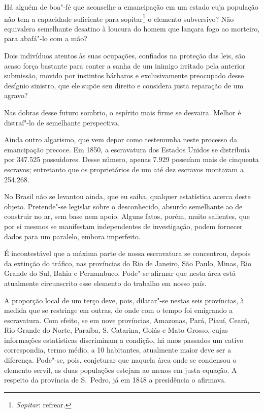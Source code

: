 Há alguém de boa"-fé que aconselhe a emancipação em um estado cuja
população não tem a capacidade suficiente para
sopitar\footnote{ \textit{Sopitar}: refrear.}
 o elemento subversivo? Não equivalera semelhante desatino à loucura do
homem que lançara fogo ao morteiro, para abafá"-lo com a mão?

Dois indivíduos atentos às suas ocupações, confiados na proteção das
leis, são acaso força bastante para conter a sanha de um inimigo
irritado pela anterior submissão, movido por instintos bárbaros e
exclusivamente preocupado desse desígnio sinistro, que ele supõe seu
direito e considera justa reparação de um agravo? 

Nas dobras desse futuro sombrio, o espírito mais firme se desvaira.
Melhor é distraí"-lo de semelhante perspectiva.  

Ainda outro algarismo, que vem depor como testemunha neste processo da
emancipação precoce. Em 1850, a escravatura dos Estados Unidos se
distribuía por 347.525 possuidores. Desse número, apenas 7.929 possuíam
mais de cinquenta escravos; entretanto que os proprietários de um até
dez escravos montavam a 254.268.

No Brasil não se levantou ainda, que eu saiba, qualquer estatística
acerca deste objeto. Pretende"-se legislar sobre o desconhecido,
absurdo semelhante ao de construir no ar, sem base nem apoio. Alguns
fatos, porém, muito salientes, que por si mesmos se manifestam
independentes de investigação, podem fornecer dados para um paralelo,
embora imperfeito.

É incontestável que a máxima parte de nossa escravatura se concentrou,
depois da extinção do tráfico, nas províncias do Rio de Janeiro, São
Paulo, Minas, Rio Grande do Sul, Bahia e Pernambuco. Pode"-se afirmar
que nesta área está atualmente circunscrito esse elemento do trabalho
em nosso país.

A proporção local de um terço deve, pois, dilatar"-se nestas seis
províncias, à medida que se restringe em outras, de onde com o tempo
foi emigrando a escravatura. Com efeito, se em nove províncias,
Amazonas, Pará, Piauí, Ceará, Rio Grande do Norte, Paraíba, S.
Catarina, Goiás e Mato Grosso, cujas informações estatísticas
discriminam a condição, há anos passados um cativo correspondia, termo
médio, a 10 habitantes, atualmente maior deve ser a diferença.
Pode"-se, pois, conjeturar que naquela área onde se condensou o
elemento servil, as duas populações estejam ao menos em justa equação.
A respeito da província de S.~Pedro, já em 1848 a presidência o afirmava.

